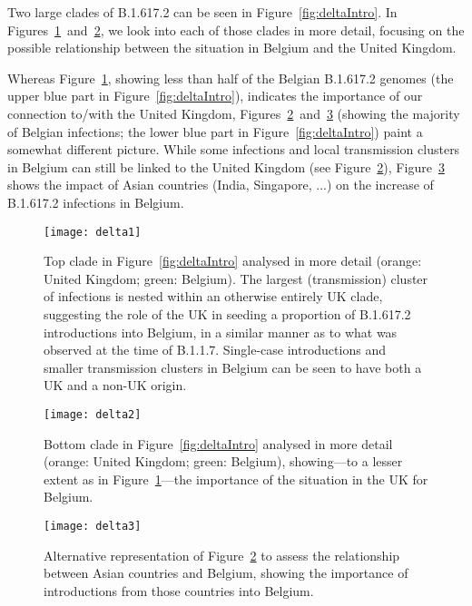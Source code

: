 Two large clades of B.1.617.2 can be seen in Figure~\ref{fig:deltaIntro}. In Figures~\ref{fig:delta1}~and~\ref{fig:delta2}, we look into each of those clades in more detail, focusing on the possible relationship between the situation in Belgium and the United Kingdom.

Whereas Figure~\ref{fig:delta1}, showing less than half of the Belgian B.1.617.2 genomes (the upper blue part in Figure~\ref{fig:deltaIntro}), indicates the importance of our connection to/with the United Kingdom, Figures~\ref{fig:delta2}~and~\ref{fig:delta3} (showing the majority of Belgian infections; the lower blue part in Figure~\ref{fig:deltaIntro}) paint a somewhat different picture.
While some infections and local transmission clusters in Belgium can still be linked to the United Kingdom (see Figure~\ref{fig:delta2}), Figure~\ref{fig:delta3} shows the impact of Asian countries (India, Singapore, ...) on the increase of B.1.617.2 infections in Belgium.

\begin{figure}[!ht]
  \centering
  \texttt{[image: delta1]}
  \caption[B.1.617.2 clade 1]{Top clade in Figure~\ref{fig:deltaIntro} analysed in more detail (orange: United Kingdom; green: Belgium). The largest (transmission) cluster of infections is nested within an otherwise entirely UK clade, suggesting the role of the UK in seeding a proportion of B.1.617.2 introductions into Belgium, in a similar manner as to what was observed at the time of B.1.1.7. Single-case introductions and smaller transmission clusters in Belgium can be seen to have both a UK and a non-UK origin.}
  \label{fig:delta1}
\end{figure}

\begin{figure}[!ht]
  \centering
  \texttt{[image: delta2]}
  \caption[B.1.617.2 clade 2]{Bottom clade in Figure~\ref{fig:deltaIntro} analysed in more detail (orange: United Kingdom; green: Belgium), showing---to a lesser extent as in Figure~\ref{fig:delta1}---the importance of the situation in the UK for Belgium.}
  \label{fig:delta2}
\end{figure}

\begin{figure}[!ht]
  \centering
  \texttt{[image: delta3]}
  \caption[B.1.617.2 alternate coloring]{Alternative representation of Figure~\ref{fig:delta2} to assess the relationship between Asian countries and Belgium, showing the importance of introductions from those countries into Belgium.}
  \label{fig:delta3}
\end{figure}


